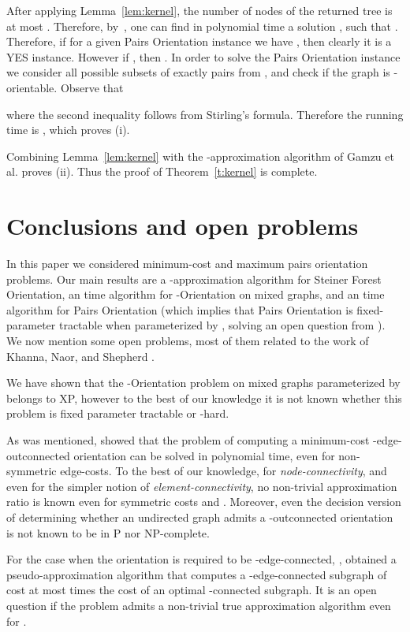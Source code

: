 \documentclass[envcountsame]{llncs}
\begin{document}
After applying Lemma~\ref{lem:kernel}, the number of nodes 
of the returned tree is at most .
Therefore, by~\cite{ZV}, one can find in polynomial time
a solution , such that .
Therefore, if for a given {\sf  Pairs Orientation} instance
we have , then clearly it is a YES instance.
However if , then . 
In order to solve the {\sf  Pairs Orientation} instance
we consider all possible  subsets  of exactly 
pairs from , and check if the graph is -orientable.
Observe that

where the second inequality follows from Stirling's formula.
Therefore the running time is , which proves (i).

Combining Lemma~\ref{lem:kernel} with the -approximation algorithm of 
Gamzu et al. \cite{segev-approx} proves (ii).
Thus the proof of Theorem~\ref{t:kernel} is complete.

\section{Conclusions and open problems}

In this paper we considered minimum-cost and maximum pairs orientation problems.
Our main results are a -approximation algorithm for {\sf Steiner Forest Orientation},
an  time algorithm for {\sf -Orientation} on mixed graphs,
and an  time algorithm for {\sf  Pairs Orientation} 
(which implies that {\sf  Pairs Orientation} is fixed-parameter tractable when parameterized by ,
solving an open question from \cite{fpt}).
We now mention some open problems, most of them related to the work of Khanna, Naor, and Shepherd \cite{KNS}.

We have shown that the {\sf -Orientation} problem on mixed graphs parameterized by  belongs to XP,
however to the best of our knowledge it is not known whether this problem is fixed parameter tractable
or -hard.

As was mentioned, \cite{KNS} 
showed that the problem of computing a minimum-cost 
-edge-outconnected orientation can be solved in polynomial time, even for non-symmetric edge-costs.
To the best of our knowledge, for {\em node-connectivity}, and even for the simpler notion 
of {\em element-connectivity}, no non-trivial approximation ratio is known even for 
symmetric costs and .
Moreover, even the decision version of determining whether 
an undirected graph admits a -outconnected orientation is not known to be in P nor NP-complete.  

For the case when the orientation  is required to be 
-edge-connected, , \cite{KNS} obtained a pseudo-approximation algorithm 
that computes a -edge-connected subgraph of cost at most  times the cost 
of an optimal -connected subgraph.
It is an open question if the problem admits a non-trivial true approximation 
algorithm even for .
\end{document}
